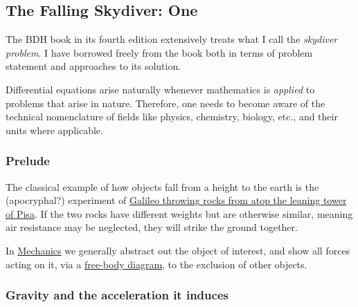 \documentclass[
  a4paper,
]{article}
\begin{document}
\subsection{The Falling Skydiver: One}\label{the-falling-skydiver-one}

The BDH book in its fourth edition extensively treats what I call the
\emph{skydiver problem}. I have borrowed freely from the book both in
terms of problem statement and approaches to its solution.

Differential equations arise naturally whenever mathematics is
\emph{applied} to problems that arise in nature. Therefore, one needs to
become aware of the technical nomenclature of fields like physics,
chemistry, biology, etc., and their units where applicable.

\subsubsection{Prelude}\label{prelude}

The classical example of how objects fall from a height to the earth is
the (apocryphal?) experiment of
\href{https://en.wikipedia.org/wiki/Galileo's_Leaning_Tower_of_Pisa_experiment}{Galileo
throwing rocks from atop the leaning tower of Pisa}. If the two rocks
have different weights but are otherwise similar, meaning air resistance
may be neglected, they will strike the ground together.

In \href{https://en.wikipedia.org/wiki/Mechanics}{Mechanics} we
generally abstract out the object of interest, and show all forces
acting on it, via a
\href{https://www.physicsclassroom.com/class/newtlaws/Lesson-2/Drawing-Free-Body-Diagrams}{free-body
diagram}, to the exclusion of other objects.

\subsubsection{Gravity and the acceleration it
induces}\label{gravity-and-the-acceleration-it-induces}
\end{document}
